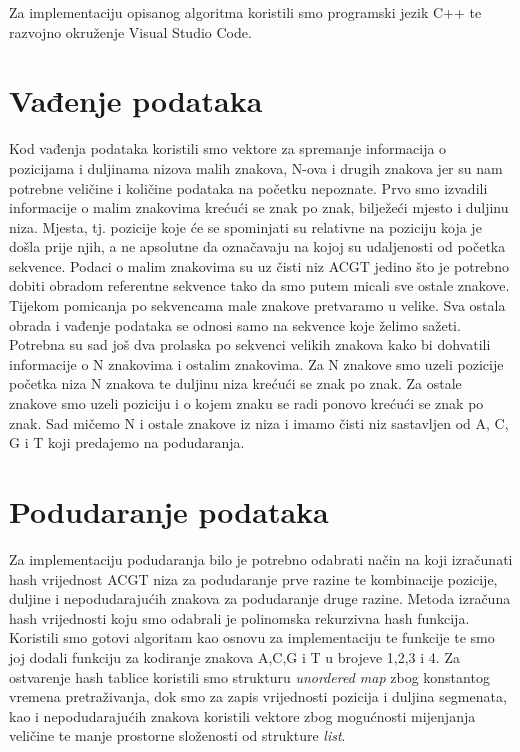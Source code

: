 Za implementaciju opisanog algoritma koristili smo programski jezik C++ te razvojno okruženje Visual Studio Code.

\section{Vađenje podataka}
Kod vađenja podataka koristili smo vektore za spremanje informacija o pozicijama i duljinama nizova malih znakova, N-ova i drugih znakova jer su nam potrebne veličine i količine podataka na početku nepoznate. Prvo smo izvadili informacije o malim znakovima krećući se znak po znak, bilježeći mjesto i duljinu niza. Mjesta, tj. pozicije koje će se spominjati su relativne na poziciju koja je došla prije njih, a ne apsolutne da označavaju na kojoj su udaljenosti od početka sekvence. Podaci o malim znakovima su uz čisti niz ACGT jedino što je potrebno dobiti obradom referentne sekvence tako da smo putem micali sve ostale znakove. Tijekom pomicanja po sekvencama male znakove pretvaramo u velike. Sva ostala obrada i vađenje podataka se odnosi samo na sekvence koje želimo sažeti. Potrebna su sad još dva prolaska po sekvenci velikih znakova kako bi dohvatili informacije o N znakovima i ostalim znakovima. Za N znakove smo uzeli pozicije početka niza N znakova te duljinu niza krećući se znak po znak. Za ostale znakove smo uzeli poziciju i o kojem znaku se radi ponovo krećući se znak po znak. Sad mičemo N i ostale znakove iz niza i imamo čisti niz sastavljen od A, C, G i T koji predajemo na podudaranja.
\pagebreak
\section{Podudaranje podataka}
Za implementaciju podudaranja bilo je potrebno odabrati način na koji izračunati hash vrijednost ACGT niza za podudaranje prve razine te kombinacije pozicije, duljine i nepodudarajućih znakova za podudaranje druge razine. Metoda izračuna hash vrijednosti koju smo odabrali je polinomska rekurzivna hash funkcija. Koristili smo gotovi algoritam kao osnovu za implementaciju te funkcije \cite{hashing} te smo joj dodali funkciju za kodiranje znakova A,C,G i T u brojeve 1,2,3 i 4.
Za ostvarenje hash tablice koristili smo strukturu \textit{unordered map} zbog konstantog vremena pretraživanja, dok smo za zapis vrijednosti pozicija i duljina segmenata, kao i nepodudarajućih znakova koristili vektore zbog mogućnosti mijenjanja veličine te manje prostorne složenosti od strukture \textit{list}.


